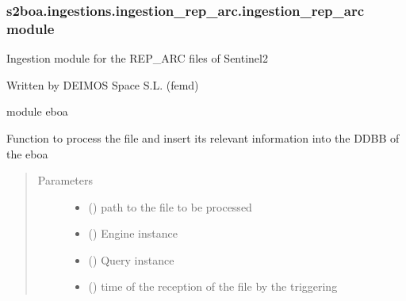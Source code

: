 \subsubsection{s2boa.ingestions.ingestion\_rep\_arc.ingestion\_rep\_arc module}
\label{\detokenize{s2boa.ingestions:module-s2boa.ingestions.ingestion_rep_arc.ingestion_rep_arc}}\label{\detokenize{s2boa.ingestions:s2boa-ingestions-ingestion-rep-arc-ingestion-rep-arc-module}}
Ingestion module for the REP\_ARC files of Sentinel\sphinxhyphen{}2

Written by DEIMOS Space S.L. (femd)

module eboa

\begin{fulllineitems}
\label{\detokenize{s2boa.ingestions:s2boa.ingestions.ingestion_rep_arc.ingestion_rep_arc.process_file}}
Function to process the file and insert its relevant information
into the DDBB of the eboa
\begin{quote}\begin{description}
\item[{Parameters}] \leavevmode\begin{itemize}
\item {} 
 () \textendash{} path to the file to be processed

\item {} 
 () \textendash{} Engine instance

\item {} 
 () \textendash{} Query instance

\item {} 
 () \textendash{} time of the reception of the file by the triggering

\end{itemize}

\end{description}\end{quote}

\end{fulllineitems}



